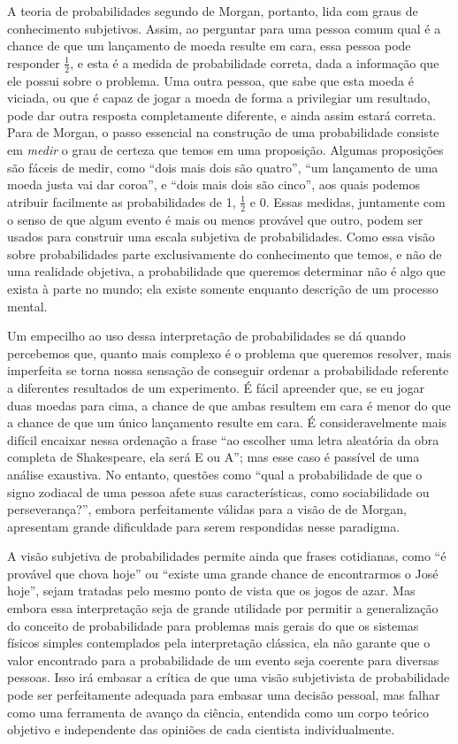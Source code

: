A teoria de probabilidades segundo de Morgan, portanto, lida com graus de conhecimento subjetivos. Assim, ao perguntar para
uma pessoa comum qual é a chance de que um lançamento de moeda resulte em cara, essa pessoa pode responder $\frac{1}{2}$, e 
esta é a medida de probabilidade correta, dada a informação que ele possui sobre o problema. Uma outra pessoa, que sabe
que esta moeda é viciada, ou que é capaz de jogar a moeda de forma a privilegiar um resultado, pode dar outra resposta
completamente diferente, e ainda assim estará correta. Para de Morgan, o passo essencial na construção de uma probabilidade
consiste em {\em medir} o grau de certeza que temos em uma proposição. Algumas proposições são fáceis de medir, como
``dois mais dois são quatro'', ``um lançamento de uma moeda justa vai dar coroa'', e ``dois mais dois são cinco'', aos quais
podemos atribuir facilmente as probabilidades de 1, $\frac{1}{2}$ e 0. Essas medidas, juntamente com o senso de que
algum evento é mais ou menos provável que outro, podem ser usados para construir uma escala subjetiva de probabilidades.
Como essa visão sobre probabilidades parte exclusivamente do conhecimento que temos, e não de uma realidade objetiva,
a probabilidade que queremos determinar não é algo que exista à parte no mundo; ela existe somente enquanto descrição
de um processo mental.

Um empecilho ao uso dessa interpretação de probabilidades se dá quando percebemos que, quanto mais complexo é o 
problema que queremos resolver, mais imperfeita se torna nossa sensação de conseguir ordenar a probabilidade referente
a diferentes resultados de um experimento. É fácil apreender que, se eu jogar duas moedas para cima, a chance de que ambas 
resultem em cara é menor do que a chance de que um único lançamento resulte em cara. É consideravelmente mais difícil encaixar
nessa ordenação a frase ``ao escolher uma letra aleatória da obra completa de Shakespeare, ela será E ou A''; mas esse caso
é passível de uma análise exaustiva. No entanto, questões como ``qual
a probabilidade de que o signo zodiacal
de uma pessoa afete
suas características, como sociabilidade ou perseverança?'', embora perfeitamente válidas para a visão de de Morgan, apresentam
grande dificuldade para serem respondidas nesse paradigma.

A visão subjetiva de probabilidades permite ainda que frases cotidianas, como ``é provável que chova hoje'' ou ``existe uma grande
chance de encontrarmos o José hoje'', sejam tratadas pelo mesmo ponto de vista que os jogos de azar. Mas
embora essa interpretação seja de grande utilidade por permitir a generalização do conceito de probabilidade para problemas
mais gerais do que os sistemas físicos simples contemplados pela interpretação clássica, ela não garante que o valor encontrado
para a probabilidade de um evento seja coerente para diversas pessoas. Isso irá embasar a crítica de que uma visão subjetivista 
de probabilidade pode ser perfeitamente adequada para embasar uma
decisão pessoal, mas falhar como  
uma ferramenta de avanço da ciência, entendida como um corpo teórico objetivo e independente das opiniões de cada cientista individualmente.

